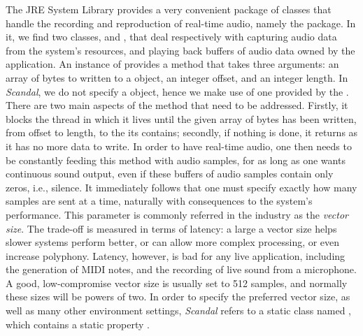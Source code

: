 The JRE System Library provides a very convenient package of classes that handle the recording and reproduction of real-time audio, namely the  package. In it, we find two classes,  and , that deal respectively with capturing audio data from the system's resources, and playing back buffers of audio data owned by the application. An instance of  provides a  method that takes three arguments: an array of bytes to written to a  object, an integer offset, and an integer length. In \emph{Scandal}, we do not specify a  object, hence we make use of one provided by the . There are two main aspects of the  method that need to be addressed. Firstly, it blocks the thread in which it lives until the given array of bytes has been written, from offset to length, to the  its  contains; secondly, if nothing is done, it returns as it has no more data to write. In order to have real-time audio, one then needs to be constantly feeding this  method with audio samples, for as long as one wants continuous sound output, even if these buffers of audio samples contain only zeros, i.e., silence. It immediately follows that one must specify exactly how many samples are sent at a time, naturally with consequences to the system's performance. This parameter is commonly referred in the industry as the \emph{vector size}. The trade-off is measured in terms of latency: a large a vector size helps slower systems perform better, or can allow more complex processing, or even increase polyphony. Latency, however, is bad for any live application, including the generation of MIDI notes, and the recording of live sound from a microphone. A good, low-compromise vector size is usually set to 512 samples, and normally these sizes will be powers of two. In order to specify the preferred vector size, as well as many other environment settings, \emph{Scandal} refers to a static class named , which contains a static property .

